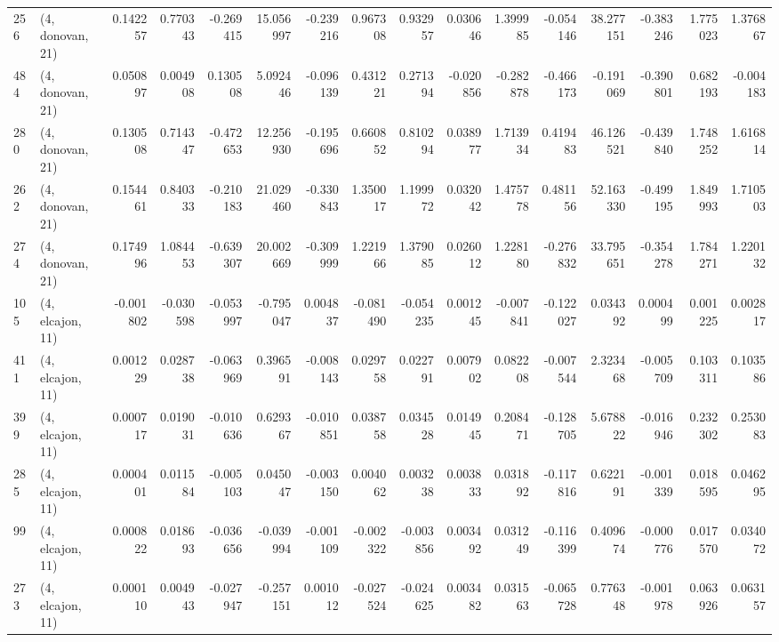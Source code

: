 \begin{tabular}{llrrrrrrrrrrrrrr}
256 &  (4, donovan, 21) &   0.142257 &  0.770343 & -0.269415 &   15.056997 & -0.239216 &   0.967308 &  0.932957 &  0.030646 &  1.399985 & -0.054146 &   38.277151 & -0.383246 &  1.775023 &  1.376867 \\
484 &  (4, donovan, 21) &   0.050897 &  0.004908 &  0.130508 &    5.092446 & -0.096139 &   0.431221 &  0.271394 & -0.020856 & -0.282878 & -0.466173 &   -0.191069 & -0.390801 &  0.682193 & -0.004183 \\
280 &  (4, donovan, 21) &   0.130508 &  0.714347 & -0.472653 &   12.256930 & -0.195696 &   0.660852 &  0.810294 &  0.038977 &  1.713934 &  0.419483 &   46.126521 & -0.439840 &  1.748252 &  1.616814 \\
262 &  (4, donovan, 21) &   0.154461 &  0.840333 & -0.210183 &   21.029460 & -0.330843 &   1.350017 &  1.199972 &  0.032042 &  1.475778 &  0.481156 &   52.163330 & -0.499195 &  1.849993 &  1.710503 \\
274 &  (4, donovan, 21) &   0.174996 &  1.084453 & -0.639307 &   20.002669 & -0.309999 &   1.221966 &  1.379085 &  0.026012 &  1.228180 & -0.276832 &   33.795651 & -0.354278 &  1.784271 &  1.220132 \\
105 &  (4, elcajon, 11) &  -0.001802 & -0.030598 & -0.053997 &   -0.795047 &  0.004837 &  -0.081490 & -0.054235 &  0.001245 & -0.007841 & -0.122027 &    0.034392 &  0.000499 &  0.001225 &  0.002817 \\
411 &  (4, elcajon, 11) &   0.001229 &  0.028738 & -0.063969 &    0.396591 & -0.008143 &   0.029758 &  0.022791 &  0.007902 &  0.082208 & -0.007544 &    2.323468 & -0.005709 &  0.103311 &  0.103586 \\
399 &  (4, elcajon, 11) &   0.000717 &  0.019031 & -0.010636 &    0.629367 & -0.010851 &   0.038758 &  0.034528 &  0.014945 &  0.208471 & -0.128705 &    5.678822 & -0.016946 &  0.232302 &  0.253083 \\
285 &  (4, elcajon, 11) &   0.000401 &  0.011584 & -0.005103 &    0.045047 & -0.003150 &   0.004062 &  0.003238 &  0.003833 &  0.031892 & -0.117816 &    0.622191 & -0.001339 &  0.018595 &  0.046295 \\
99  &  (4, elcajon, 11) &   0.000822 &  0.018693 & -0.036656 &   -0.039994 & -0.001109 &  -0.002322 & -0.003856 &  0.003492 &  0.031249 & -0.116399 &    0.409674 & -0.000776 &  0.017570 &  0.034072 \\
273 &  (4, elcajon, 11) &   0.000110 &  0.004943 & -0.027947 &   -0.257151 &  0.001012 &  -0.027524 & -0.024625 &  0.003482 &  0.031563 & -0.065728 &    0.776348 & -0.001978 &  0.063926 &  0.063157 \\

\end{tabular}
